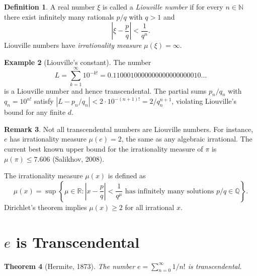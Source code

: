 \documentclass[12pt,a4paper]{amsart}
\newtheorem{theorem}{Theorem}[section]
\theoremstyle{definition}
\newtheorem{definition}[theorem]{Definition}
\newtheorem{example}[theorem]{Example}
\newtheorem{remark}[theorem]{Remark}
\begin{document}
\begin{definition}
A real number $\xi$ is called a \emph{Liouville number} if for every $n \in
\mathbb{N}$ there exist infinitely many rationals $p/q$ with $q > 1$ and
\[
  \left|\xi - \frac{p}{q}\right| < \frac{1}{q^n}.
\]
Liouville numbers have \emph{irrationality measure} $\mu(\xi) = \infty$.
\end{definition}

\begin{example}[Liouville's constant]
The number
\[
  L = \sum_{k=1}^{\infty} 10^{-k!}
  = 0.1100010000000000000000010\ldots
\]
is a Liouville number and hence transcendental. The partial sums
$p_n / q_n$ with $q_n = 10^{n!}$ satisfy $|L - p_n/q_n| < 2 \cdot
10^{-(n+1)!} = 2/q_n^{n+1}$, violating Liouville's bound for any finite $d$.
\end{example}

\begin{remark}
Not all transcendental numbers are Liouville numbers. For instance, $e$ has
irrationality measure $\mu(e) = 2$, the same as any algebraic irrational.
The current best known upper bound for the irrationality measure of $\pi$ is $\mu(\pi) \leq 7.606$ (Salikhov, 2008).
\end{remark}

The irrationality measure $\mu(x)$ is defined as
\[
  \mu(x) = \sup\!\left\{\mu \in \mathbb{R} : \left|x - \frac{p}{q}\right|
  < \frac{1}{q^\mu} \text{ has infinitely many solutions } p/q \in \mathbb{Q}
  \right\}.
\]
Dirichlet's theorem implies $\mu(x) \geq 2$ for all irrational $x$.


\section{\texorpdfstring{$e$ is Transcendental}{e is Transcendental}}
\label{sec:e-transcendental}

\begin{theorem}[Hermite, 1873]
\label{thm:e-transcendental}
The number $e = \sum_{n=0}^{\infty} 1/n!$ is transcendental.
\end{theorem}
\end{document}
